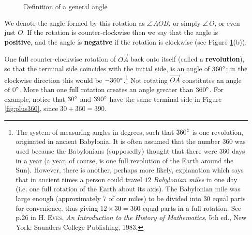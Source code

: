 \begin{figure}[h]
 \centering
 \qquad\qquad
 \caption[]{\quad Definition of a general angle}
 \label{fig:genangle}
\end{figure}

We denote the angle formed by this rotation as $\angle\,AOB$, or simply $\angle\,O$, or even just
$O$. If the rotation is counter-clockwise then we say that the angle is
\textbf{positive}, and the angle is
\textbf{negative} if the rotation is clockwise (see
Figure \ref{fig:genangle}(b)).

One full counter-clockwise rotation of $\overrightarrow{OA}$ back onto itself (called a
\textbf{revolution}), so that the terminal
side coincides with the initial side, is an angle of $360^\circ$; in the clockwise direction this
would be $-360^\circ$.\footnote{The system of measuring angles in degrees, such that $360^\circ$
is one revolution, originated in ancient Babylonia. It is often assumed that the number
$360$ was used because the Babylonians (supposedly) thought that there were $360$ days in a year (a
year, of course, is one full revolution of the Earth around the Sun). However, there is another,
perhaps more likely, explanation which says that in ancient times a person could travel $12$
\emph{Babylonian miles} in one day (i.e. one full rotation of the Earth about its axis). The
Babylonian mile was large enough (approximately $7$ of our miles) to be divided into $30$ equal
parts for convenience, thus giving $12 \times 30 = 360$ equal parts in a full rotation. See p.26 in
\textsc{H. Eves}, \emph{An Introduction to the History of Mathematics}, 5th ed., New York:
Saunders College Publishing, 1983.} Not rotating $\overrightarrow{OA}$ constitutes an angle of
$0^\circ$. More than one full rotation creates an angle greater than $360^\circ$. For
example, notice that $30^\circ$ and $390^\circ$ have the same terminal side in
Figure \ref{fig:plus360}, since $30 + 360 = 390$.

